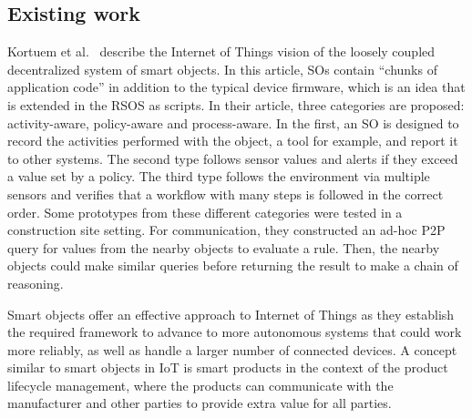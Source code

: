 \subsection{Existing work}



Kortuem et al.~\cite{Smart_objects_as_building_blocks_for_the_Internet_of_things} describe the Internet of Things vision of the loosely coupled decentralized system of smart objects. In this article, SOs contain ``chunks of application code'' in addition to the typical device firmware, which is an idea that is extended in the RSOS as scripts. In their article, three categories are proposed: activity-aware, policy-aware and process-aware. In the first, an SO is designed to record the activities performed with the object, a tool for example, and report it to other systems. The second type follows sensor values and alerts if they exceed a value set by a policy. The third type follows the environment via multiple sensors and verifies that a workflow with many steps is followed in the correct order. Some prototypes from these different categories were tested in a construction site setting. For communication, they constructed an ad-hoc P2P query for values from the nearby objects to evaluate a rule. Then, the nearby objects could make similar queries before returning the result to make a chain of reasoning.

Smart objects offer an effective approach to Internet of Things as they establish the required framework to advance to more autonomous systems that could work more reliably, as well as handle a larger number of connected devices. A concept similar to smart objects in IoT is smart products in the context of the product lifecycle management, where the products can communicate with the manufacturer and other parties to provide extra value for all parties.

